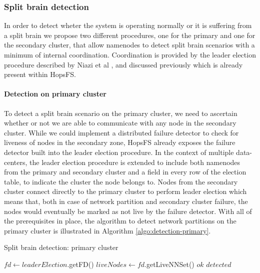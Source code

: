\subsubsection{Split brain detection}
In order to detect wheter the system is operating normally or it is suffering from a split brain we propose two different procedures, one for the primary and one for the secondary cluster, that allow namenodes to detect split brain scenarios with a minimum of internal coordination.
Coordination is provided by the leader election procedure described by Niazi et al \cite{DBLP:conf/fast/NiaziIHDGR17}, and discussed previously which is already present within HopsFS.

\paragraph{Detection on primary cluster}

To detect a split brain scenario on the primary cluster, we need to ascertain whether or not we are able to communicate with any node in the secondary cluster.
While we could implement a distributed failure detector to check for liveness of nodes in the secondary zone, HopsFS already exposes the failure detector built into the leader election procedure.
In the context of multiple data-centers, the leader election procedure is extended to include both namenodes from the primary and secondary cluster and a field in every row of the election table, to indicate the cluster the node belongs to.
Nodes from the secondary cluster connect directly to the primary cluster to perform leader election which means that, both in case of network partition and secondary cluster failure, the nodes would eventually be marked as not live by the failure detector.
With all of the prerequisites in place, the algorithm to detect network partitions on the primary cluster is illustrated in Algorithm \ref{algo:detection-primary}.

\begin{algorithm}[!ht]
	\begin{algorithmic}[1]
  		\caption{Split brain detection: primary cluster}
  		\label{algo:detection-primary}
  		\State $fd \leftarrow leaderElection$.getFD()
		\State $liveNodes \leftarrow fd$.getLiveNNSet()
		        \State \Return $ok$
		    \EndIf
		\EndFor
		\State \Return $detected$
  	\end{algorithmic}
\end{algorithm}

